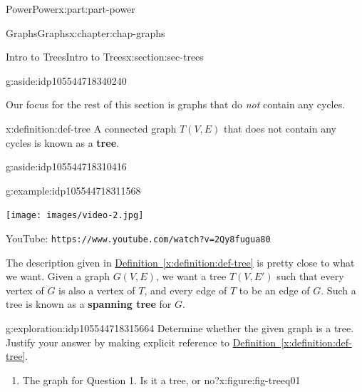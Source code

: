 \documentclass[oneside,10pt,]{book}
\newcommand{\xreffont}{\relax}
\newcommand{\mono}[1]{\texttt{#1}}
\newcommand{\terminology}[1]{\textbf{#1}}
\numberwithin{equation}{section}
\newlength{\qrsize}
\newlength{\previewwidth}
\begin{document}
\begin{partptx}{Power}{}{Power}{}{}{x:part:part-power}
\begin{chapterptx}{Graphs}{}{Graphs}{}{}{x:chapter:chap-graphs}
\begin{sectionptx}{Intro to Trees}{}{Intro to Trees}{}{}{x:section:sec-trees}
\begin{aside}{}{g:aside:idp105544718340240}
\end{aside}
%
\par
Our focus for the rest of this section is graphs that do \emph{not} contain any cycles.%
\begin{definition}{}{x:definition:def-tree}%
%
A connected graph \(T(V,E)\) that does not contain any cycles is known as a \terminology{tree}. \begin{aside}{}{g:aside:idp105544718310416}%
\end{aside}
%
\end{definition}
\begin{example}{}{g:example:idp105544718311568}%
\setlength{\qrsize}{9em}
\setlength{\previewwidth}{\linewidth}
\addtolength{\previewwidth}{-\qrsize}
\begin{tcbraster}[raster columns=2, raster column skip=1pt, raster halign=center, raster force size=false, raster left skip=0pt, raster right skip=0pt]%
\begin{tcolorbox}[previewstyle, width=\previewwidth]%
\texttt{[image: images/video-2.jpg]}%
\end{tcolorbox}%
\begin{tcolorbox}[qrstyle]%
{\hypersetup{urlcolor=black}}%
\end{tcolorbox}%
\begin{tcolorbox}[captionstyle]%
\small YouTube: \mono{https://www.youtube.com/watch?v=2Qy8fugua80}\end{tcolorbox}%
\end{tcbraster}%
\end{example}
The description given in \hyperref[x:definition:def-tree]{Definition~{\xreffont\ref{x:definition:def-tree}}} is pretty close to what we want. Given a graph \(G(V,E)\), we want a tree \(T(V,E')\) such that every vertex of \(G\) is also a vertex of \(T\), and every edge of \(T\) to be an edge of \(G\). Such a tree is known as a \terminology{spanning tree} for \(G\).%
\begin{exploration}{}{g:exploration:idp105544718315664}%
Determine whether the given graph is a tree. Justify your answer by making explicit reference to \hyperref[x:definition:def-tree]{Definition~{\xreffont\ref{x:definition:def-tree}}}.%
%
\begin{enumerate}
\item{}\begin{figureptx}{The graph for Question 1. Is it a tree, or no?}{x:figure:fig-treeq01}{}%
\begin{image}{0.25}{0.5}{0.25}%

\end{image}
\end{figureptx}
\end{enumerate}
\end{exploration}
\end{sectionptx}
\end{chapterptx}
\end{partptx}
\end{document}
